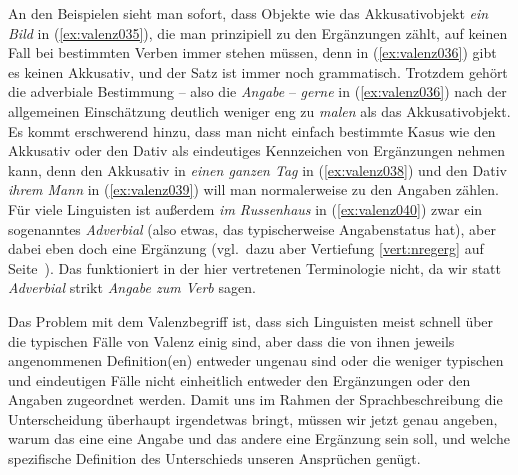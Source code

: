 \begin{exe}
  \ex\label{ex:valenz034}
  \begin{xlist}
  \end{xlist}
\end{exe}

An den Beispielen sieht man sofort, dass Objekte wie das Akkusativobjekt \textit{ein Bild} in (\ref{ex:valenz035}), die man prinzipiell zu den Ergänzungen zählt, auf keinen Fall bei bestimmten Verben immer stehen müssen, denn in (\ref{ex:valenz036}) gibt es keinen Akkusativ, und der Satz ist immer noch grammatisch.
Trotzdem gehört die adverbiale Bestimmung -- also die \textit{Angabe} -- \textit{gerne} in (\ref{ex:valenz036}) nach der allgemeinen Einschätzung deutlich weniger eng zu \textit{malen} als das Akkusativobjekt.
Es kommt erschwerend hinzu, dass man nicht einfach bestimmte Kasus wie den Akkusativ oder den Dativ als eindeutiges Kennzeichen von Ergänzungen nehmen kann, denn den Akkusativ in \textit{einen ganzen Tag} in (\ref{ex:valenz038}) und den Dativ \textit{ihrem Mann} in (\ref{ex:valenz039}) will man normalerweise zu den Angaben zählen.
Für viele Linguisten ist außerdem \textit{im Russenhaus} in (\ref{ex:valenz040}) zwar ein sogenanntes \textit{Adverbial} (also etwas, das typischerweise Angabenstatus hat), aber dabei eben doch eine Ergänzung (vgl.\ dazu aber Vertiefung \ref{vert:nregerg} auf Seite~\pageref{vert:nregerg}).
Das funktioniert in der hier vertretenen Terminologie nicht, da wir statt \textit{Adverbial} strikt \textit{Angabe zum Verb} sagen.

\begin{exe}
  \ex\label{ex:valenz037}
  \begin{xlist}
  \end{xlist}
\end{exe}

Das Problem mit dem Valenzbegriff ist, dass sich Linguisten meist schnell über die typischen Fälle von Valenz einig sind, aber dass die von ihnen jeweils angenommenen Definition(en) entweder ungenau sind oder die weniger typischen und eindeutigen Fälle nicht einheitlich entweder den Ergänzungen oder den Angaben zugeordnet werden.
Damit uns im Rahmen der Sprachbeschreibung die Unterscheidung überhaupt irgendetwas bringt, müssen wir jetzt genau angeben, warum das eine eine Angabe und das andere eine Ergänzung sein soll, und welche spezifische Definition des Unterschieds unseren Ansprüchen genügt.

